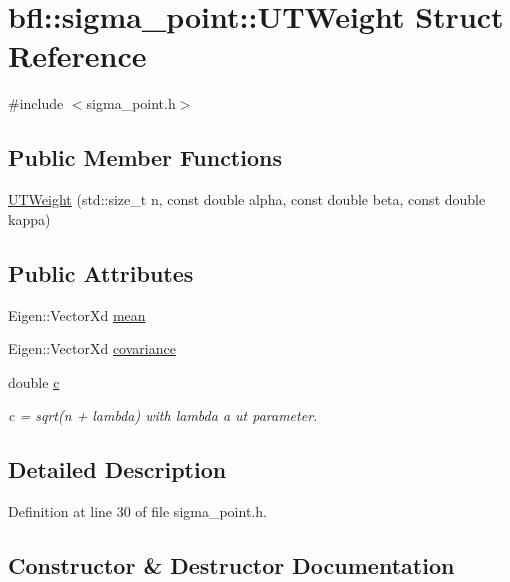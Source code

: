 \hypertarget{structbfl_1_1sigma__point_1_1UTWeight}{}\section{bfl\+:\+:sigma\+\_\+point\+:\+:U\+T\+Weight Struct Reference}
\label{structbfl_1_1sigma__point_1_1UTWeight}


{\ttfamily \#include $<$sigma\+\_\+point.\+h$>$}

\subsection*{Public Member Functions}
\begin{DoxyCompactItemize}
\item 
\mbox{\hyperlink{structbfl_1_1sigma__point_1_1UTWeight_a72931837cdd99f042be08a99deaa54d2}{U\+T\+Weight}} (std\+::size\+\_\+t n, const double alpha, const double beta, const double kappa)
\end{DoxyCompactItemize}
\subsection*{Public Attributes}
\begin{DoxyCompactItemize}
\item 
Eigen\+::\+Vector\+Xd \mbox{\hyperlink{structbfl_1_1sigma__point_1_1UTWeight_aa265298724b6547d123c7a96dec210b2}{mean}}
\item 
Eigen\+::\+Vector\+Xd \mbox{\hyperlink{structbfl_1_1sigma__point_1_1UTWeight_a493c778f012c80ddd4049aa61d22514b}{covariance}}
\item 
double \mbox{\hyperlink{structbfl_1_1sigma__point_1_1UTWeight_a861b9163db2779b84d7af79ba03e4203}{c}}
\begin{DoxyCompactList}\small\item\em c = sqrt(n + lambda) with lambda a ut parameter. \end{DoxyCompactList}\end{DoxyCompactItemize}


\subsection{Detailed Description}


Definition at line 30 of file sigma\+\_\+point.\+h.



\subsection{Constructor \& Destructor Documentation}
\mbox{\label{structbfl_1_1sigma__point_1_1UTWeight_a72931837cdd99f042be08a99deaa54d2}} 
